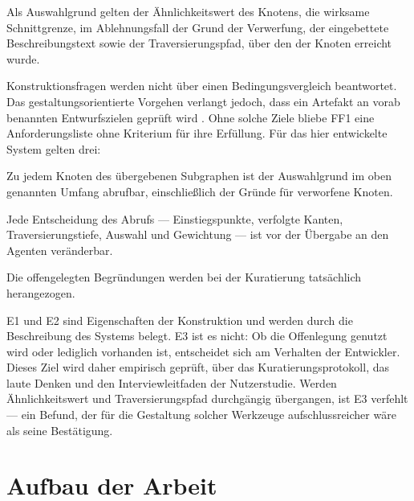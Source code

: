Als Auswahlgrund gelten der Ähnlichkeitswert des Knotens, die wirksame Schnittgrenze, im Ablehnungsfall der Grund der Verwerfung, der eingebettete Beschreibungstext sowie der Traversierungspfad, über den der Knoten erreicht wurde.

Konstruktionsfragen werden nicht über einen Bedingungsvergleich beantwortet. Das gestaltungsorientierte Vorgehen verlangt jedoch, dass ein Artefakt an vorab benannten Entwurfszielen geprüft wird \parencite{hevner2004dsr}. Ohne solche Ziele bliebe FF1 eine Anforderungsliste ohne Kriterium für ihre Erfüllung. Für das hier entwickelte System gelten drei:

\begin{description}[leftmargin=2.2em,style=nextline,itemsep=0.2em]
  \item[E1] Zu jedem Knoten des übergebenen Subgraphen ist der Auswahlgrund im oben genannten Umfang abrufbar, einschließlich der Gründe für verworfene Knoten.
  \item[E2] Jede Entscheidung des Abrufs --- Einstiegspunkte, verfolgte Kanten, Traversierungstiefe, Auswahl und Gewichtung --- ist vor der Übergabe an den Agenten veränderbar.
  \item[E3] Die offengelegten Begründungen werden bei der Kuratierung tatsächlich herangezogen.
\end{description}

E1 und E2 sind Eigenschaften der Konstruktion und werden durch die Beschreibung des Systems belegt. E3 ist es nicht: Ob die Offenlegung genutzt wird oder lediglich vorhanden ist, entscheidet sich am Verhalten der Entwickler. Dieses Ziel wird daher empirisch geprüft, über das Kuratierungsprotokoll, das laute Denken und den Interviewleitfaden der Nutzerstudie. Werden Ähnlichkeitswert und Traversierungspfad durchgängig übergangen, ist E3 verfehlt --- ein Befund, der für die Gestaltung solcher Werkzeuge aufschlussreicher wäre als seine Bestätigung.

\section{Aufbau der Arbeit}%
\label{sec:aufbau}
